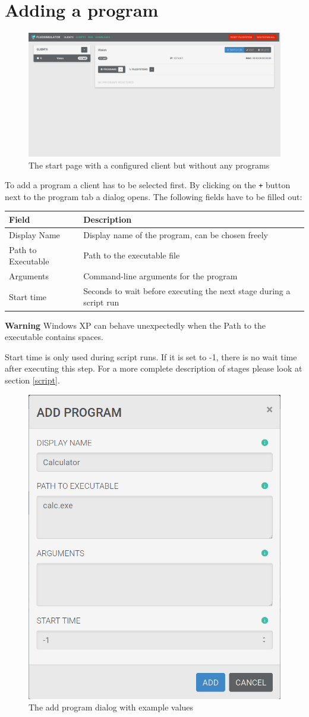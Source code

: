 \documentclass[accentcolor=tud1a, paper=a4, colorback]{tudreport}
\begin{document}
	\section{Adding a program}
	\begin{figure}[h]
		\centering
		\includegraphics[width=.9\textwidth]{startpage_without_programs}
		\caption{The start page with a configured client but without any programs}
		\label{startpage_without_programs}
	\end{figure}
	To add a program a client has to be selected first. By clicking on the \texttt{+}
	button next to the program tab a dialog opens. The following fields have to be filled
	out:
	\begin{center}
	\begin{tabular}{l|l}
		Field & Description \\\hline
		Display Name &  Display name of the program, can be chosen freely\\
		Path to Executable & Path to the executable file\\
		Arguments & Command-line arguments for the program\\
		Start time & Seconds to wait before executing the next stage during a script run\\
	\end{tabular}
		\begin{tcolorbox}[width=\textwidth, colback=red!30, arc=0pt, boxrule=0pt]
		{\color{red}\textbf{Warning}}\hspace{0.5cm}
		Windows XP can behave unexpectedly when the Path to the executable contains spaces.
		\end{tcolorbox}
	\end{center}
	Start time is only used during script runs. If it is set to -1, there is
	no wait time after executing this step. For a more complete description of
	stages please look at section \ref{script}.

	\begin{figure}[h]
		\centering
		\includegraphics[width=.3\textwidth]{add_program}
		\caption{The add program dialog with example values}
		\label{add_program}
	\end{figure}
\end{document}
